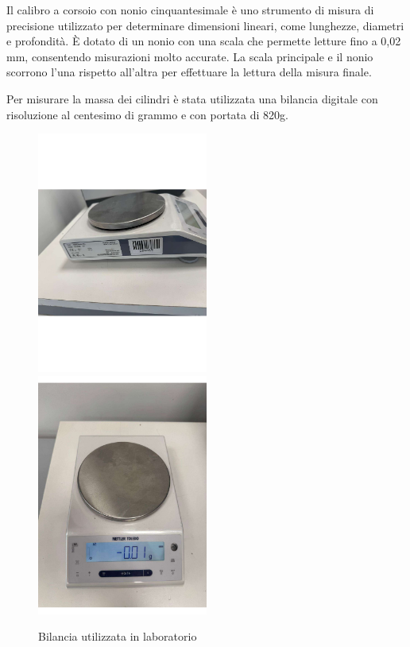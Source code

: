 \documentclass[11pt]{article}
\begin{document}
Il calibro a corsoio con nonio cinquantesimale è uno strumento di misura di precisione utilizzato per determinare dimensioni lineari, come lunghezze, diametri e profondità. È dotato di un nonio con una scala che permette letture fino a 0,02 mm, consentendo misurazioni molto accurate. La scala principale e il nonio scorrono l'una rispetto all'altra per effettuare la lettura della misura finale.

Per misurare la massa dei cilindri è stata utilizzata una bilancia digitale con risoluzione al centesimo di grammo e con portata di 820g.

\begin{figure}[ht]
  \includegraphics[width=0.5\textwidth]{WhatsApp Image 2024-10-25 at 16.42.15 (1).pdf}
  \includegraphics[width=0.5\textwidth]{WhatsApp Image 2024-10-25 at 16.42.23.pdf}
  \caption{Bilancia utilizzata in laboratorio}
\end{figure}
\end{document}
